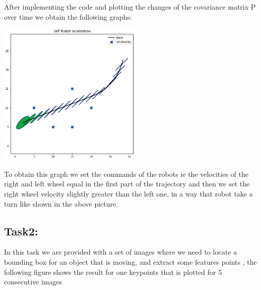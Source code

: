 \documentclass[11pt,a4paper]{report}
\begin{document}
\begin{enumerate}
After implementing the code and plotting the changes of the covariance matrix P over time we obtain the following graphs:
 
\begin{center}\label{fig2}
	\includegraphics[width=7cm]{Capture2.png}
\end{center}
 
To obtain this graph we set the commands of the robots ie the velocities of the right and left wheel equal in the first part of the trajectory and then we set the right wheel velocity slightly greater than the left one, in a way that robot take a turn like shown in the above picture. 
 
\subsection{\textbf{Task2:}}
In this task we are provided with a set of images where we need to locate a bounding box for an object that is moving, and extract some features points , the following figure shows the result for one keypoints that is plotted for 5 consecutive images     
\end{enumerate}
\end{document}

